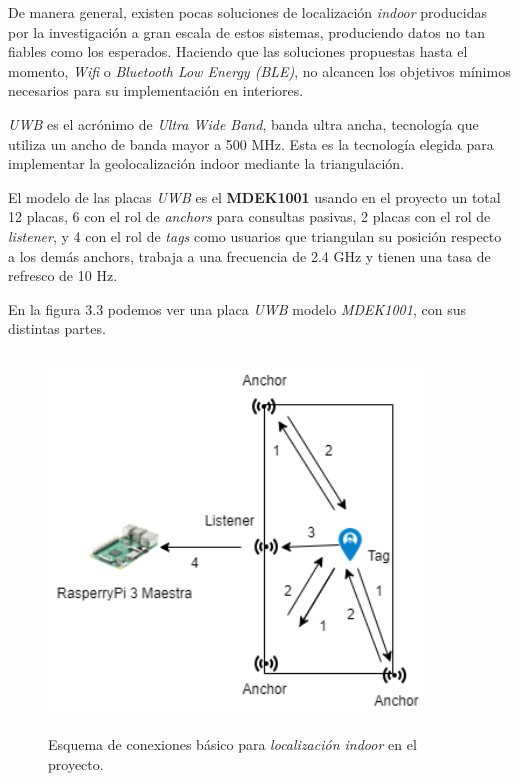 De manera general, existen pocas soluciones de localización \textit{indoor} producidas por la investigación a gran escala de estos sistemas, produciendo datos
no tan fiables como los esperados. Haciendo que las soluciones propuestas
hasta el momento, \textit{Wifi} o \textit{Bluetooth Low Energy (BLE)}, no alcancen los
objetivos mínimos necesarios para su implementación en interiores.

\textit{UWB} es el acrónimo de \textit{Ultra Wide Band}, banda ultra ancha, tecnología que utiliza un ancho de banda mayor a 500 MHz\cite{xataka:uwb}. Esta es la tecnología elegida para implementar la geolocalización indoor mediante la triangulación.

El modelo de las placas \textit{UWB} es el \textbf{MDEK1001} usando en el proyecto un total 12 placas, 6 con el rol de \textit{anchors} para consultas pasivas, 2 placas con el rol de \textit{listener}, y 4 con el rol de \textit{tags} como usuarios que triangulan su posición respecto a los demás anchors, trabaja a una frecuencia de 2.4 GHz y tienen una tasa de refresco de 10 Hz.

En la figura 3.3 podemos ver una placa \textit{UWB} modelo \textit{MDEK1001}, con sus distintas partes.


\begin{figure}[t]
    \centering
    \includegraphics[width=10cm,height=10cm,keepaspectratio]{img/Esquema Conexiones UWB.drawio.png}
    \caption{Esquema de conexiones básico para \textit{localización indoor} en el proyecto.}
    \label{fig:exmaple_indoor_loc}
\end{figure}

